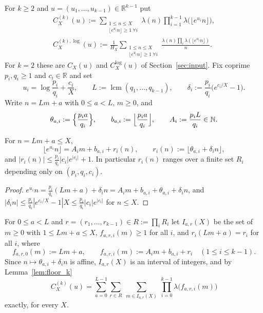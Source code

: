For $k\ge2$ and $u=(u_1,\dots,u_{k-1})\in\mathbb R^{k-1}$ put
\begin{equation}
\begin{gathered}
C^{(k)}_X(u):=\sum_{\substack{1\le n\le X\\ \lfloor e^{u_i}n\rfloor\ge1\ \forall i}}\lambda(n)\prod_{i=1}^{k-1}\lambda\bigl(\lfloor e^{u_i}n\rfloor\bigr),
\\
C^{(k),\log}_X(u):=\frac1{H_X}\sum_{\substack{1\le n\le X\\ \lfloor e^{u_i}n\rfloor\ge1\ \forall i}}\frac{\lambda(n)\prod_{i}\lambda(\lfloor e^{u_i}n\rfloor)}{n}.
\end{gathered}
\label{eq:Ck}
\end{equation}
For $k=2$ these are $C_X(u)$ and $C^{\log}_X(u)$ of Section~\ref{sec:input}. Fix coprime $p_i,q_i\ge1$ and $c_i\in\mathbb R$ and set
\begin{equation}
u_i=\log\frac{p_i}{q_i}+\frac{c_i}{X},\qquad L:=\operatorname{lcm}(q_1,\dots,q_{k-1}),\qquad \delta_i:=\frac{p_i}{q_i}\bigl(e^{c_i/X}-1\bigr).
\label{eq:uk}
\end{equation}
Write $n=Lm+a$ with $0\le a<L$, $m\ge0$, and
\begin{equation}
\theta_{a,i}:=\Bigl\{\frac{p_ia}{q_i}\Bigr\},\qquad b_{a,i}:=\Bigl\lfloor\frac{p_ia}{q_i}\Bigr\rfloor,\qquad A_i:=\frac{p_iL}{q_i}\in\mathbb N .
\label{eq:theta_k}
\end{equation}

\begin{lemma}
\label{lem:floor_k}
For $n=Lm+a\le X$,
\begin{equation}
\lfloor e^{u_i}n\rfloor=A_im+b_{a,i}+r_i(n),\qquad r_i(n):=\bigl\lfloor\theta_{a,i}+\delta_in\bigr\rfloor,
\label{eq:floor_k}
\end{equation}
and $|r_i(n)|\le\frac{p_i}{q_i}|c_i|e^{|c_i|}+1$. In particular $r_i(n)$ ranges over a finite set $R_i$ depending only on $(p_i,q_i,c_i)$.
\end{lemma}

\begin{proof}
$e^{u_i}n=\frac{p_i}{q_i}(Lm+a)+\delta_in=A_im+b_{a,i}+\theta_{a,i}+\delta_in$, and $|\delta_in|\le\frac{p_i}{q_i}|e^{c_i/X}-1|X\le\frac{p_i}{q_i}|c_i|e^{|c_i|}$ for $n\le X$.
\end{proof}

For $0\le a<L$ and $r=(r_1,\dots,r_{k-1})\in R:=\prod_iR_i$ let $I_{a,r}(X)$ be the set of $m\ge0$ with $1\le Lm+a\le X$, $f_{a,r,i}(m)\ge1$ for all $i$, and $r_i(Lm+a)=r_i$ for all $i$, where
\begin{equation}
f_{a,r,0}(m):=Lm+a,\qquad f_{a,r,i}(m):=A_im+b_{a,i}+r_i\quad(1\le i\le k-1).
\label{eq:forms_k}
\end{equation}
Since $n\mapsto\theta_{a,i}+\delta_in$ is affine, $I_{a,r}(X)$ is an interval of integers, and by Lemma~\ref{lem:floor_k}
\begin{equation}
C^{(k)}_X(u)=\sum_{a=0}^{L-1}\sum_{r\in R}\ \sum_{m\in I_{a,r}(X)}\ \prod_{i=0}^{k-1}\lambda\bigl(f_{a,r,i}(m)\bigr)
\label{eq:dec0_k}
\end{equation}
exactly, for every $X$.

